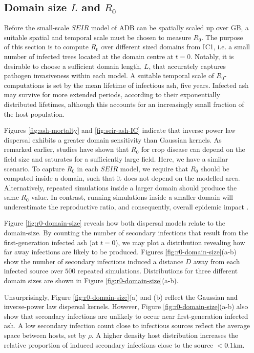 \subsection{Domain size $L$ and $R_0$}
\label{sec:r0-vs-L}

Before the small-scale $SEIR$ model of ADB can be spatially scaled up over GB, a suitable spatial and temporal scale must be chosen to measure $R_0$.
The purpose of this section is to compute $R_0$ over different sized domains from IC1, i.e. a small number of infected trees located at the domain centre at $t=0$.
Notably, it is desirable to choose a sufficient domain length, $L$, that accurately captures pathogen invasiveness within each model.
A suitable temporal scale of $R_0$-computations is set by the mean lifetime of infectious ash, five years.
Infected ash may survive for more extended periods, according to their exponentially distributed lifetimes, although this accounts for an increasingly small fraction of the host population.

Figures \ref{fig:ash-mortalty} and \ref{fig:seir-ash-IC} indicate that inverse power law dispersal exhibits a greater domain sensitivity than Gaussian kernels.
As remarked earlier, studies have shown that $R_0$ for crop disease can depend on the field size \cite{mikaberidze2016invasiveness} and saturates for a sufficiently large field.
Here, we have a similar scenario.
To capture $R_0$ in each $SEIR$ model, we require that $R_0$ should be computed inside a domain, such that it does not depend on the modelled area. 
Alternatively, repeated simulations inside a larger domain should produce the same $R_0$ value.
In contrast, running simulations inside a smaller domain will underestimate the reproductive ratio, and consequently, overall epidemic impact \cite{R0-perc-ref, time-varying-infectivity}.

Figure \ref{fig:r0-domain-size} reveals how both dispersal models relate to the domain-size.
By counting the number of secondary infections that result from the first-generation infected ash (at $t=0$), we may plot a distribution revealing how far away infections are likely to be produced.
Figures \ref{fig:r0-domain-size}(a-b) show the number of secondary infections induced a distance $D$ away from each infected source over $500$ repeated simulations.
Distributions for three different domain sizes are shown in Figure \ref{fig:r0-domain-size}(a-b).

Unsurprisingly, Figure \ref{fig:r0-domain-size}(a) and (b) reflect the Gaussian and inverse-power law dispersal kernels. 
However, Figure \ref{fig:r0-domain-size}(a-b) also show that secondary infections are unlikely to occur near first-generation infected ash.
A low secondary infection count close to infectious sources reflect the average space between hosts, set by $\rho$.
A higher density host distribution increases the relative proportion of induced secondary infections close to the source $<0.1\mathrm{km}$.

